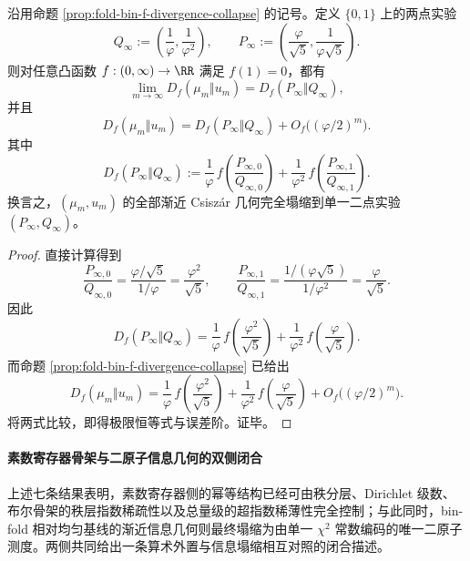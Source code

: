 \begin{proposition}\label{prop:xi-foldbin-f-divergence-two-point-experiment}
沿用命题 \ref{prop:fold-bin-f-divergence-collapse} 的记号。定义 \(\{0,1\}\) 上的两点实验
\[
Q_\infty:=\left(\frac1\varphi,\frac1{\varphi^2}\right),
\qquad
P_\infty:=\left(\frac{\varphi}{\sqrt5},\frac{1}{\varphi\sqrt5}\right).
\]
则对任意凸函数 \(f:(0,\infty)\to\RR\) 满足 \(f(1)=0\)，都有
\[
\boxed{\;
\lim_{m\to\infty}D_f(\mu_m\Vert u_m)
=
D_f(P_\infty\Vert Q_\infty),\;}
\]
并且
\[
\boxed{\;
D_f(\mu_m\Vert u_m)
=
D_f(P_\infty\Vert Q_\infty)
+O_f\bigl((\varphi/2)^m\bigr).\;}
\]
其中
\[
D_f(P_\infty\Vert Q_\infty)
:=
\frac1\varphi\,f\!\left(\frac{P_{\infty,0}}{Q_{\infty,0}}\right)
+\frac1{\varphi^2}\,f\!\left(\frac{P_{\infty,1}}{Q_{\infty,1}}\right).
\]
换言之，\((\mu_m,u_m)\) 的全部渐近 Csisz\'ar 几何完全塌缩到单一二点实验 \((P_\infty,Q_\infty)\)。
\end{proposition}
\begin{proof}
直接计算得到
\[
\frac{P_{\infty,0}}{Q_{\infty,0}}
=
\frac{\varphi/\sqrt5}{1/\varphi}
=
\frac{\varphi^2}{\sqrt5},
\qquad
\frac{P_{\infty,1}}{Q_{\infty,1}}
=
\frac{1/(\varphi\sqrt5)}{1/\varphi^2}
=
\frac{\varphi}{\sqrt5}.
\]
因此
\[
D_f(P_\infty\Vert Q_\infty)
=
\frac1\varphi\,f\!\left(\frac{\varphi^2}{\sqrt5}\right)
+\frac1{\varphi^2}\,f\!\left(\frac{\varphi}{\sqrt5}\right).
\]
而命题 \ref{prop:fold-bin-f-divergence-collapse} 已给出
\[
D_f(\mu_m\Vert u_m)
=
\frac1\varphi\,f\!\left(\frac{\varphi^2}{\sqrt5}\right)
+\frac1{\varphi^2}\,f\!\left(\frac{\varphi}{\sqrt5}\right)
+O_f\bigl((\varphi/2)^m\bigr).
\]
将两式比较，即得极限恒等式与误差阶。证毕。
\end{proof}

\paragraph{素数寄存器骨架与二原子信息几何的双侧闭合}
上述七条结果表明，素数寄存器侧的幂等结构已经可由秩分层、Dirichlet 级数、布尔骨架的秩层指数稀疏性以及总量级的超指数稀薄性完全控制；与此同时，bin-fold 相对均匀基线的渐近信息几何则最终塌缩为由单一 \(\chi^2\) 常数编码的唯一二原子测度。两侧共同给出一条算术外置与信息塌缩相互对照的闭合描述。

\endinput
